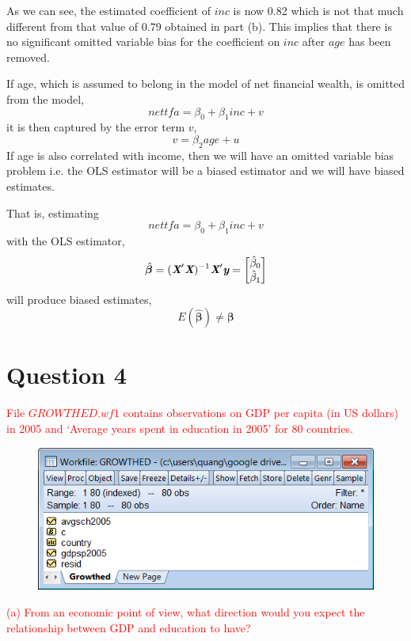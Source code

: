 \documentclass[12pt]{report}
\begin{document}
\justify \noindent As we can see, the estimated coefficient of $inc$ is now 0.82 which is not that much different from that value of 0.79 obtained in part (b). This implies that there is no significant omitted variable bias for the coefficient on $inc$ after $age$ has been removed.

\noindent If age, which is assumed to belong in the model of net financial wealth, is omitted from the model, $$nettfa = \beta_0 + \beta_1inc + v$$ it is then captured by the error term $v$, $$v = \beta_2age + u$$ If age is also correlated with income, then we will have an omitted variable bias problem i.e. the OLS estimator will be a biased estimator and we will have biased estimates.

\noindent That is, estimating $$nettfa = \beta_0 + \beta_1inc + v$$ with the OLS estimator,  $$\hat{\boldsymbol{\beta}} = (\textit{\textbf{X}}'\textit{\textbf{X}})^{-1}\textit{\textbf{X}}'\textit{\textbf{y}} = \begin{bmatrix}
\hat{\beta}_0 \\
\hat{\beta}_1
\end{bmatrix}$$ will produce biased estimates, $$E(\hat{\boldsymbol{\beta}}) \neq \boldsymbol{\beta}$$

\newpage
\section*{Question 4}
\noindent \textcolor{red}{File $GROWTHED.wf1$ contains observations on GDP per capita (in US dollars) in 2005 and `Average years spent in education in 2005' for 80 countries.}
\begin{figure}[H]
	\centering
	\includegraphics{tute6_q4_1}
\end{figure}
\vspace{-\baselineskip}
\noindent \textcolor{red}{(a) From an economic point of view, what direction would you expect the relationship between GDP and education to have?}
\end{document}
